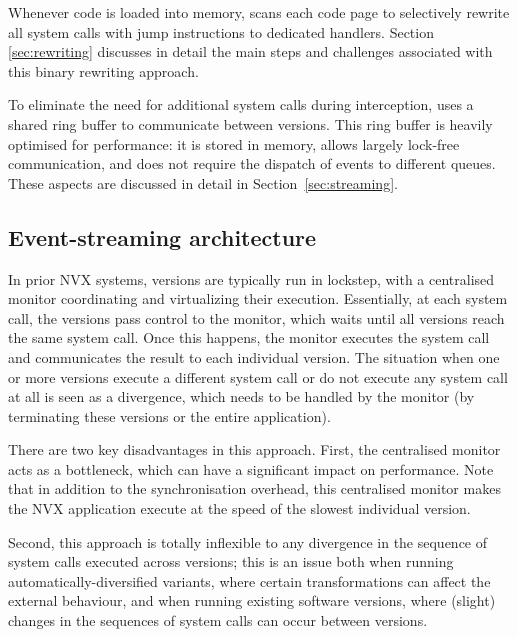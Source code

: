 Whenever code is loaded into memory, \varan scans each code page to
selectively rewrite all system calls with jump instructions to dedicated
handlers.  Section \ref{sec:rewriting} discusses in detail the main
steps and challenges associated with this binary rewriting approach.

To eliminate the need for additional system calls during interception,
\varan uses a shared ring buffer to communicate between versions.  This
ring buffer is heavily optimised for performance: it is stored in
memory, allows largely lock-free communication, and does not require
the dispatch of events to different queues.  These aspects are
discussed in detail in Section~\ref{sec:streaming}.



\subsection{Event-streaming architecture}
\label{sec:coordination}

In prior NVX systems, versions are typically run in lockstep, with a
centralised monitor coordinating and virtualizing their execution.
Essentially, at each system call, the versions pass control to the
monitor, which waits until all versions reach the same system call.
Once this happens, the monitor executes the system call and
communicates the result to each individual version. The situation when
one or more versions execute a different system call or do not execute
any system call at all is seen as a divergence, which needs to be
handled by the monitor (\eg by terminating these versions or the
entire application).

There are two key disadvantages in this approach.  First, the
centralised monitor acts as a bottleneck, which can have a significant
impact on performance.  Note that in addition to the synchronisation
overhead, this centralised monitor makes the NVX application execute
at the speed of the slowest individual version.

Second, this approach is totally inflexible to any divergence in the
sequence of system calls executed across versions; this is an issue
both when running automatically-diversified variants, where certain
transformations can affect the external behaviour, and when running
existing software versions, where (slight) changes in the sequences of
system calls can occur between versions. 

